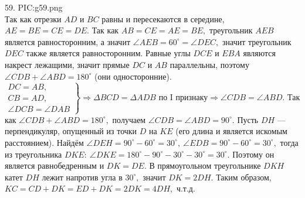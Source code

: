 59. {{PIC:g59.png}}\\
Так как отрезки $AD$ и $BC$ равны и пересекаются в середине, $AE=BE=CE=DE.$ Так как $AB=CE=AE=BE,$ треугольник $AEB$ является равносторонним, а значит $\angle AEB=60^\circ=\angle DEC,$ значит треугольник $DEC$ также является равносторонним. Равные углы $DCE$ и $EBA$ являются накрест лежащими, значит прямые $DC$ и $AB$ параллельны, поэтому $\angle CDB+\angle ABD=180^\circ$ (они односторонние). $\left.\begin{array}{l}DC=AB,\\
CB=AD,\\
\angle DCB=\angle DAB  \end{array}\right\}\Rightarrow \Delta BCD=\Delta ADB\text{ по I признаку}\Rightarrow \angle CDB=\angle ABD.$ Так как $\angle CDB+\angle ABD=180^\circ,$ получаем $\angle CDB=\angle ABD=90^\circ.$ Пусть $DH$ --- перпендикуляр, опущенный из точки $D$ на $KE$ (его длина и является искомым расстоянием). Найдём $\angle DEH=90^\circ-60^\circ=30^\circ,\ \angle EDB=90^\circ-60^\circ=30^\circ,$ тогда из треугольника $DKE:\ \angle DKE=180^\circ-90^\circ-30^\circ-30^\circ=30^\circ.$ Поэтому он является равнобедренным и $DK=DE.$ В прямоугольном треугольнике $DKH$ катет $DH$ лежит напротив угла в $30^\circ,$ значит $DK=2DH.$ Таким образом, $KC=CD+DK=ED+DK=2DK=4DH,$ ч.т.д.\\
